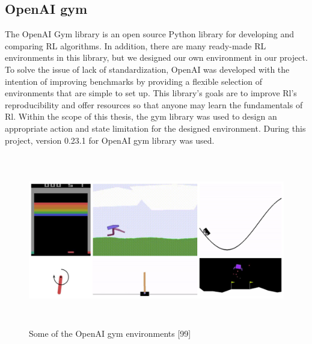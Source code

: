\documentclass[12pt,twoside,a4]{mwbk}
\begin{document}
\subsection{OpenAI gym}
The OpenAI Gym library is an open source Python library for developing and comparing RL algorithms. In addition, there are many ready-made RL environments in this library, but we designed our own environment in our project. To solve the issue of lack of standardization, OpenAI was developed with the intention of improving benchmarks by providing a flexible selection of environments that are simple to set up. This library's goals are to improve Rl's reproducibility and offer resources so that anyone may learn the fundamentals of Rl. Within the scope of this thesis, the gym library was used to design an appropriate action and state limitation for the designed environment. During this project, version 0.23.1 for OpenAI gym library was used.
\newpage
\begin{figure}[h]
    \centering
    \includegraphics[width=15.0cm, height=7.5cm]{openaigym.jpg}
    \caption{Some of the OpenAI gym environments [99]}
\end{figure}
\end{document}

